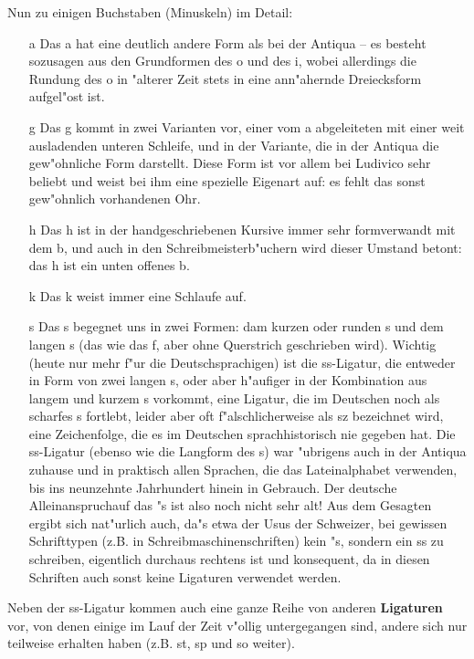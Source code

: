 \documentclass[draft,12pt,a4paper,german]{article}
\begin{document}
Nun zu einigen Buchstaben (Minuskeln) im Detail:
\begin{itemize}
\item[a] Das a hat eine deutlich andere Form als bei der Antiqua -- es besteht
sozusagen aus den Grundformen des o und des i, wobei allerdings die
Rundung des o in "alterer Zeit stets in eine ann"ahernde Dreiecksform
aufgel"ost ist.

\item[g] Das g kommt in zwei Varianten vor, einer vom a abgeleiteten mit
einer weit ausladenden unteren Schleife, und in der Variante, die in der
Antiqua die gew"ohnliche Form darstellt. Diese Form ist vor allem bei
Ludivico sehr beliebt und weist bei ihm eine spezielle Eigenart auf: es
fehlt das sonst gew"ohnlich vorhandenen \glqq Ohr\grqq .

\item[h] Das h ist in der handgeschriebenen Kursive immer sehr formverwandt
mit dem b, und auch in den Schreibmeisterb"uchern wird dieser Umstand betont:
das h ist ein unten offenes b.

\item[k] Das k weist immer eine Schlaufe auf.

\item[s] Das s begegnet uns in zwei Formen: dam kurzen oder runden s und
dem langen s (das wie das f, aber ohne Querstrich geschrieben wird).
Wichtig (heute nur mehr f"ur die Deutschsprachigen) ist die ss-Ligatur, die
entweder in Form von zwei langen s, oder aber h"aufiger in der Kombination
aus langem und kurzem s vorkommt, eine Ligatur, die im Deutschen noch als
scharfes s fortlebt, leider aber oft f"alschlicherweise als \glqq sz\grqq
bezeichnet
wird, eine Zeichenfolge, die es im Deutschen sprachhistorisch nie gegeben
hat. Die ss-Ligatur (ebenso wie die Langform des s) war "ubrigens auch in der
Antiqua zuhause und in praktisch allen Sprachen, die das Lateinalphabet
verwenden, bis ins neunzehnte Jahrhundert hinein in Gebrauch. Der deutsche
\glqq Alleinanspruch\grqq  auf das "s ist also noch nicht sehr alt! Aus dem
Gesagten
ergibt sich nat"urlich auch, da"s etwa der Usus der Schweizer, bei gewissen
Schrifttypen (z.B. in Schreibmaschinenschriften) kein "s, sondern ein ss zu
schreiben, eigentlich durchaus rechtens ist und konsequent, da in diesen
Schriften auch sonst keine Ligaturen verwendet werden.
\end{itemize}

Neben der ss-Ligatur kommen auch eine ganze Reihe von anderen 
\textbf{Ligaturen} vor, von denen einige im Lauf der Zeit v"ollig
untergegangen sind, andere sich nur teilweise erhalten haben (z.B. st,
sp und so weiter).
\end{document}
